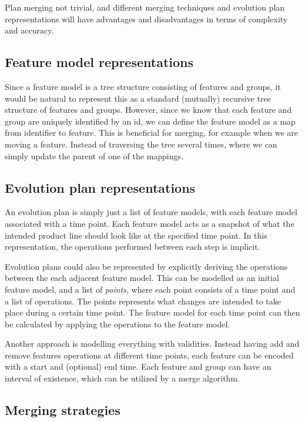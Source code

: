 \documentclass[a4paper,english]{ifimaster}
\begin{document}
Plan merging not trivial, and different merging techniques and evolution plan representations will have advantages and disadvantages in terms of complexity and accuracy.

\subsection{Feature model representations}%
\label{sub:feature_model_representations}

Since a feature model is a tree structure consisting of features and groups, it would be natural to represent this as a standard (mutually) recursive tree structure of features and groups. However, since we know that each feature and group are uniquely identified by an id, we can define the feature model as a map from identifier to feature. This is beneficial for merging, for example when we are moving a feature. Instead of traversing the tree several times, where we can simply update the parent of one of the mappings.

\subsection{Evolution plan representations}%
\label{sub:evolution_plan_representations}

An evolution plan is simply just a list of feature models, with each feature model associated with a time point. Each feature model acts as a snapshot of what the intended product line should look like at the specified time point. In this representation, the operations performed between each step is implicit.

Evolution plans could also be represented by explicitly deriving the operations between the each adjacent feature model. This can be modelled as an initial feature model, and a list of \textit{points}, where each point consists of a time point and a list of operations. The points represents what changes are intended to take place during a certain time point. The feature model for each time point can then be calculated by applying the operations to the feature model.

Another approach is modelling everything with validities. Instead having add and remove features operations at different time points, each feature can be encoded with a start and (optional) end time. Each feature and group can have an interval of existence, which can be utilized by a merge algorithm.

\subsection{Merging strategies}%
\label{sub:merging_strategies}
\end{document}
